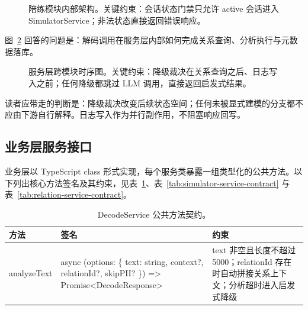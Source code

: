 \begin{figure}[H]
  \centering
  
  \caption{陪练模块内部架构。关键约束：会话状态门禁只允许 active 会话进入 SimulatorService；非法状态直接返回错误响应。}
  \label{fig:pebble-dojo-module-arch}
\end{figure}

图~\ref{fig:pebble-service-cross-sequence} 回答的问题是：解码调用在服务层内部如何完成关系查询、分析执行与元数据落库。

\begin{figure}[H]
  \centering
  
  \caption{服务层跨模块时序图。关键约束：降级裁决在关系查询之后、日志写入之前；任何降级都跳过 LLM 调用，直接返回启发式结果。}
  \label{fig:pebble-service-cross-sequence}
\end{figure}

读者应带走的判断是：降级裁决改变后续状态空间；任何未被显式建模的分支都不应由下游自行解释。日志写入作为并行副作用，不阻塞响应回写。

\subsection{业务层服务接口}

业务层以 TypeScript class 形式实现，每个服务类暴露一组类型化的公共方法。以下列出核心方法签名及其约束，见表~\ref{tab:decode-service-contract}、表~\ref{tab:simulator-service-contract} 与表~\ref{tab:relation-service-contract}。

\begin{table}[H]
  \centering
  \caption{DecodeService 公共方法契约。}
  \label{tab:decode-service-contract}
  \begin{tabularx}{\textwidth}{>{\raggedright\arraybackslash}p{3.2cm} >{\raggedright\arraybackslash}X >{\raggedright\arraybackslash}p{3.5cm}}
    \toprule
    方法 & 签名 & 约束 \\
    \midrule
    analyzeText & async (options: \{ text: string, context?, relationId?, skipPII? \}) => Promise<DecodeResponse> & text 非空且长度不超过 5000；relationId 存在时自动拼接关系上下文；分析超时进入启发式降级 \\
    \bottomrule
  \end{tabularx}
\end{table}

